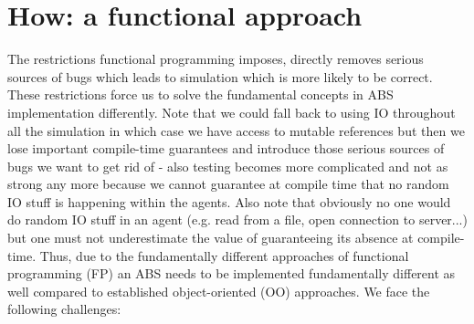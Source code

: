 \section{How: a functional approach}
The restrictions functional programming imposes, directly removes serious sources of bugs which leads to simulation which is more likely to be correct. These restrictions force us to solve the fundamental concepts in ABS implementation differently. Note that we could fall back to using IO throughout all the simulation in which case we have access to mutable references but then we lose important compile-time guarantees and introduce those serious sources of bugs we want to get rid of - also testing becomes more complicated and not as strong any more because we cannot guarantee at compile time that no random IO stuff is happening within the agents. Also note that obviously no one would do random IO stuff in an agent (e.g. read from a file, open connection to server...) but one must not underestimate the value of guaranteeing its absence at compile-time. Thus, due to the fundamentally different approaches of functional programming (FP) an ABS needs to be implemented fundamentally different as well compared to established object-oriented (OO) approaches. We face the following challenges:

